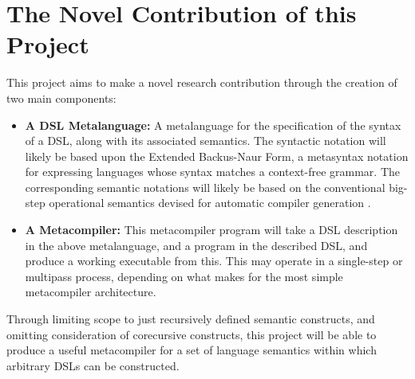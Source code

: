 \documentclass[a4paper,11pt]{report}
\begin{document}
\section{The Novel Contribution of this Project} %
\label{sec:the_novel_contribution_of_this_project}
This project aims to make a novel research contribution through the creation of two main components:
\begin{itemize}
    \item \textbf{A DSL Metalanguage:} A metalanguage for the specification of the syntax of a DSL, along with its associated semantics. 
    The syntactic notation will likely be based upon the Extended Backus-Naur Form, a metasyntax notation for expressing languages whose syntax matches a context-free grammar. 
    The corresponding semantic notations will likely be based on the conventional big-step operational semantics \citep{Schmidt:2003:PLS:1074100.1074733} devised for automatic compiler generation \citep{diehl1996semantics}.
    \item \textbf{A Metacompiler:} This metacompiler program will take a DSL description in the above metalanguage, and a program in the described DSL, and produce a working executable from this. 
    This may operate in a single-step or multipass process, depending on what makes for the most simple metacompiler architecture.
\end{itemize}

Through limiting scope to just recursively defined semantic constructs, and omitting consideration of corecursive constructs, this project will be able to produce a useful metacompiler for a set of language semantics within which arbitrary DSLs can be constructed. 

\end{document}
